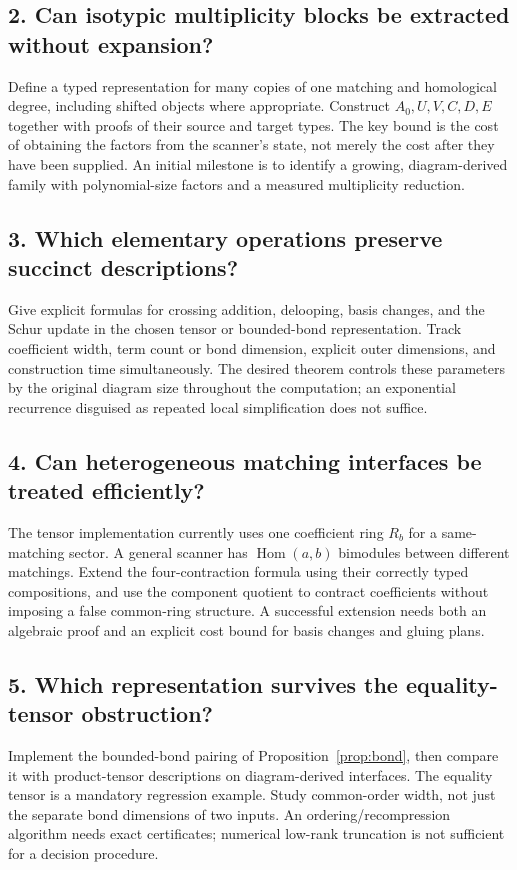 \documentclass[11pt]{article}
\theoremstyle{definition}\newtheorem{definition}[theorem]{Definition}
\theoremstyle{remark}\newtheorem{remark}[theorem]{Remark}
\newcommand{\Hom}{\operatorname{Hom}}
\begin{document}
\subsection{2. Can isotypic multiplicity blocks be extracted without expansion?}
Define a typed representation for many copies of one matching and homological degree, including shifted objects where appropriate. Construct $A_0,U,V,C,D,E$ together with proofs of their source and target types. The key bound is the cost of obtaining the factors from the scanner's state, not merely the cost after they have been supplied. An initial milestone is to identify a growing, diagram-derived family with polynomial-size factors and a measured multiplicity reduction.

\subsection{3. Which elementary operations preserve succinct descriptions?}
Give explicit formulas for crossing addition, delooping, basis changes, and the Schur update in the chosen tensor or bounded-bond representation. Track coefficient width, term count or bond dimension, explicit outer dimensions, and construction time simultaneously. The desired theorem controls these parameters by the original diagram size throughout the computation; an exponential recurrence disguised as repeated local simplification does not suffice.

\subsection{4. Can heterogeneous matching interfaces be treated efficiently?}
The tensor implementation currently uses one coefficient ring $R_b$ for a same-matching sector. A general scanner has $\Hom(a,b)$ bimodules between different matchings. Extend the four-contraction formula using their correctly typed compositions, and use the component quotient to contract coefficients without imposing a false common-ring structure. A successful extension needs both an algebraic proof and an explicit cost bound for basis changes and gluing plans.

\subsection{5. Which representation survives the equality-tensor obstruction?}
Implement the bounded-bond pairing of Proposition~\ref{prop:bond}, then compare it with product-tensor descriptions on diagram-derived interfaces. The equality tensor is a mandatory regression example. Study common-order width, not just the separate bond dimensions of two inputs. An ordering/recompression algorithm needs exact certificates; numerical low-rank truncation is not sufficient for a decision procedure.
\end{document}
